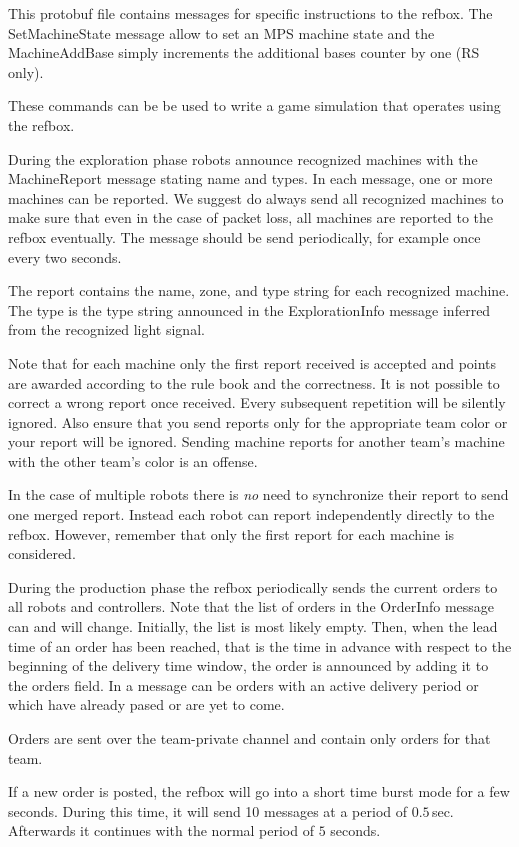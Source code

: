 \documentclass[a4paper]{article}
\begin{document}
%
{%
  This protobuf file contains messages for specific instructions to
  the refbox. The SetMachineState message allow to set an MPS machine
  state and the MachineAddBase simply increments the additional bases
  counter by one (RS only).

  These commands can be be used to write a game simulation that
  operates using the refbox.
}

%
{%
  During the exploration phase robots announce recognized machines
  with the MachineReport message stating name and types. In each
  message, one or more machines can be reported. We suggest do always
  send all recognized machines to make sure that even in the case of
  packet loss, all machines are reported to the refbox eventually. The
  message should be send periodically, for example once every two
  seconds.

  \medskip
  The report contains the name, zone, and type string for each
  recognized machine. The type is the type string announced in the
  ExplorationInfo message inferred from the recognized light signal.

  \medskip

  Note that for each machine only the first report received is
  accepted and points are awarded according to the rule book and the
  correctness. It is not possible to correct a wrong report once
  received. Every subsequent repetition will be silently ignored. Also
  ensure that you send reports only for the appropriate team color or
  your report will be ignored. Sending machine reports for another
  team's machine with the other team's color is an offense.

  \medskip

  In the case of multiple robots there is \emph{no} need to
  synchronize their report to send one merged report. Instead each
  robot can report independently directly to the refbox. However,
  remember that only the first report for each machine is considered.

}

%
{%
  During the production phase the refbox periodically sends the
  current orders to all robots and controllers. Note that the list of
  orders in the OrderInfo message can and will change. Initially, the
  list is most likely empty. Then, when the lead time of an order has
  been reached, that is the time in advance with respect to the
  beginning of the delivery time window, the order is announced by
  adding it to the orders field. In a message can be orders with an
  active delivery period or which have already pased or are yet to
  come.

  \medskip
  Orders are sent over the team-private channel and contain only
  orders for that team.

  \medskip
  If a new order is posted, the refbox will go into a short time burst
  mode for a few seconds. During this time, it will send 10 messages
  at a period of $0.5$\,sec. Afterwards it continues with the normal
  period of $5$ seconds.
}
\end{document}
